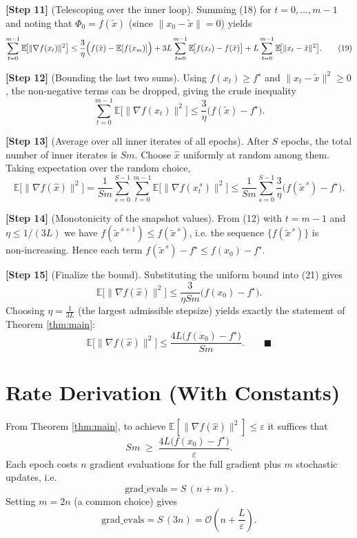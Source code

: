 \documentclass{article}
\newcommand{\EE}{\mathbb{E}}
\newcommand{\grad}{\nabla}
\begin{document}
\noindent\textbf{[Step 11]} (Telescoping over the inner loop). Summing (18) for $t=0,\dots,m-1$ and noting that $\Phi_0 = f(\tilde{x})$ (since $\|x_0-\tilde{x}\|=0$) yields
\[
\sum_{t=0}^{m-1}\EE\!\bigl[\|\grad f(x_t)\|^{2}\bigr]
\le \frac{3}{\eta}\Bigl(f(\tilde{x})- \EE[f(x_{m})]\Bigr)
     + 3L\sum_{t=0}^{m-1}\EE\!\bigl[f(x_t)-f(\tilde{x})\bigr]
     + L\sum_{t=0}^{m-1}\EE\!\bigl[\|x_t-\tilde{x}\|^{2}\bigr].
\tag{19}
\]

\noindent\textbf{[Step 12]} (Bounding the last two sums). Using $f(x_t)\ge f^{\star}$ and $\|x_t-\tilde{x}\|^{2}\ge0$, the non‑negative terms can be dropped, giving the crude inequality
\[
\sum_{t=0}^{m-1}\EE\!\bigl[\|\grad f(x_t)\|^{2}\bigr]
\le \frac{3}{\eta}\bigl(f(\tilde{x})-f^{\star}\bigr).
\tag{20}
\]

\noindent\textbf{[Step 13]} (Average over all inner iterates of all epochs). After $S$ epochs, the total number of inner iterates is $Sm$. Choose $\hat{x}$ uniformly at random among them. Taking expectation over the random choice,
\[
\EE\!\bigl[\|\grad f(\hat{x})\|^{2}\bigr]
= \frac{1}{Sm}\sum_{s=0}^{S-1}\sum_{t=0}^{m-1}
   \EE\!\bigl[\|\grad f(x_{t}^{\,s})\|^{2}\bigr]
\le \frac{1}{Sm}\sum_{s=0}^{S-1}\frac{3}{\eta}
        \bigl(f(\tilde{x}^{\,s})-f^{\star}\bigr).
\tag{21}
\]

\noindent\textbf{[Step 14]} (Monotonicity of the snapshot values). From (12) with $t=m-1$ and $\eta\le 1/(3L)$ we have $f(\tilde{x}^{\,s+1})\le f(\tilde{x}^{\,s})$, i.e. the sequence $\{f(\tilde{x}^{\,s})\}$ is non‑increasing. Hence each term $f(\tilde{x}^{\,s})-f^{\star}\le f(x_{0})-f^{\star}$.

\noindent\textbf{[Step 15]} (Finalize the bound). Substituting the uniform bound into (21) gives
\[
\EE\!\bigl[\|\grad f(\hat{x})\|^{2}\bigr]
\le \frac{3}{\eta Sm}\bigl(f(x_{0})-f^{\star}\bigr).
\]
Choosing $\eta = \frac{1}{3L}$ (the largest admissible stepsize) yields exactly the statement of Theorem \ref{thm:main}:
\[
\EE\!\bigl[\|\grad f(\hat{x})\|^{2}\bigr]
\le \frac{4L\bigl(f(x_{0})-f^{\star}\bigr)}{Sm}.
\qquad\blacksquare
\]

\section*{Rate Derivation (With Constants)}
From Theorem \ref{thm:main}, to achieve $\EE[\|\grad f(\hat{x})\|^{2}]\le\varepsilon$ it suffices that
\[
Sm \;\ge\; \frac{4L\bigl(f(x_{0})-f^{\star}\bigr)}{\varepsilon}.
\]
Each epoch costs $n$ gradient evaluations for the full gradient plus $m$ stochastic updates, i.e.
\[
\text{grad\_evals}= S\,(n+m).
\]
Setting $m=2n$ (a common choice) gives
\[
\text{grad\_evals}
= S\,(3n)
= \mathcal{O}\!\left(n + \frac{L}{\varepsilon}\right).
\]
\end{document}
